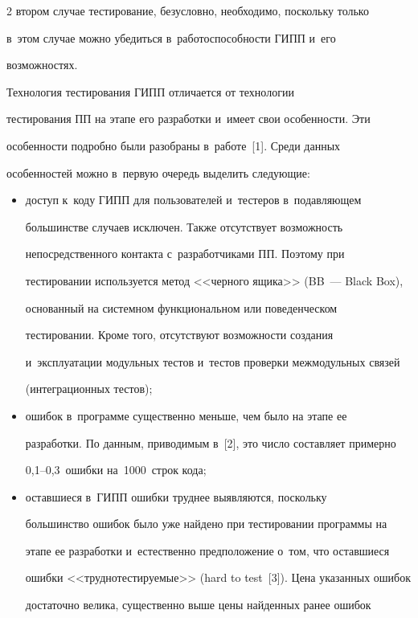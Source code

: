 \begin{multicols}{2}
втором случае тестирование, безусловно, необходимо, поскольку только 


в~этом случае можно убедиться в~ра\-бо\-то\-спо\-соб\-ности ГИПП и~его 


возможностях.


    


        Технология тестирования ГИПП отличается от технологии 


тестирования ПП на этапе его разработки и~имеет свои особенности. Эти 


особенности подробно были разобраны в~работе~[1]. Среди данных 


особенностей можно в~первую очередь выделить следующие:


    \begin{itemize}


    \item доступ к~коду ГИПП для пользователей и~тестеров в~подавляющем 


большинстве случаев исключен. Также отсутствует возможность 


непосредственного контакта с~разработчиками ПП. Поэтому при 


тестировании используется метод <<черного ящика>> (BB~--- Black Box), 


основанный на системном функциональном или поведенческом 


тестировании. Кроме того, отсутствуют возможности создания 


и~эксплуатации модульных тестов и~тестов проверки межмодульных связей 


(интеграционных тестов);    


    \item ошибок в~программе существенно меньше, чем было на этапе ее 


разработки. По данным, приводимым в~[2], это число составляет примерно 


0,1--0,3~ошибки на~1000~строк кода;


    \item  оставшиеся в~ГИПП ошибки труднее выявляются, поскольку 


большинство ошибок было уже найдено при тестировании программы на 


этапе ее разработки и~естественно предположение о~том, что оставшиеся 


ошибки <<труд\-но\-тес\-ти\-ру\-емые>> (hard to test~[3]). Цена указанных ошибок 


достаточно велика, существенно выше цены найденных ранее ошибок 



\end{itemize}
\end{multicols}
